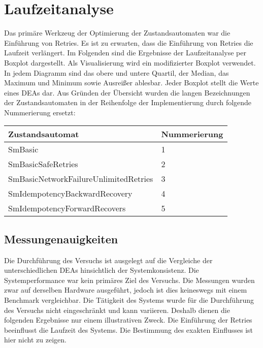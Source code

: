 \section{Laufzeitanalyse}

Das primäre Werkzeug der Optimierung der Zustandsautomaten war die Einführung von Retries. Es ist zu erwarten, dass die Einführung von Retries die Laufzeit verlängert. Im Folgenden sind die Ergebnisse der Laufzeitanalyse per Boxplot dargestellt. Als Visualisierung wird ein modifizierter Boxplot verwendet. In jedem Diagramm sind das obere und untere Quartil, der Median, das Maximum und Minimum sowie Ausreißer ablesbar. Jeder Boxplot stellt die Werte eines DEAs dar. Aus Gründen der Übersicht wurden die langen Bezeichnungen der Zustandsautomaten in der Reihenfolge der Implementierung durch folgende Nummerierung ersetzt:

\begin{center}
	\begin{tabular}[h]{|p{8cm}|p{3cm}|}
		\hline
		Zustandsautomat & Nummerierung \\ \hline
		SmBasic & 1 \\ \hline
		SmBasicSafeRetries & 2 \\ \hline
		SmBasicNetworkFailureUnlimitedRetries & 3 \\ \hline
		SmIdempotencyBackwardRecovery & 4 \\ \hline		
		SmIdempotencyForwardRecovers & 5 \\ \hline
	\end{tabular}
\end{center}
\FloatBarrier

\subsection{Messungenauigkeiten} \label{subsec:messungenauigkeiten}
Die Durchführung des Versuchs ist ausgelegt auf die Vergleiche der unterschiedlichen DEAs hinsichtlich der Systemkonsistenz. Die Systemperformance war kein primäres Ziel des Versuchs. Die Messungen wurden zwar auf derselben Hardware ausgeführt, jedoch ist dies keineswegs mit einem Benchmark vergleichbar. Die Tätigkeit des Systems wurde für die Durchführung des Versuchs nicht eingeschränkt und kann variieren. Deshalb dienen die folgenden Ergebnisse nur einem illustrativen Zweck. Die Einführung der Retries beeinflusst die Laufzeit des Systems. Die Bestimmung des exakten Einflusses ist hier nicht zu zeigen.



















